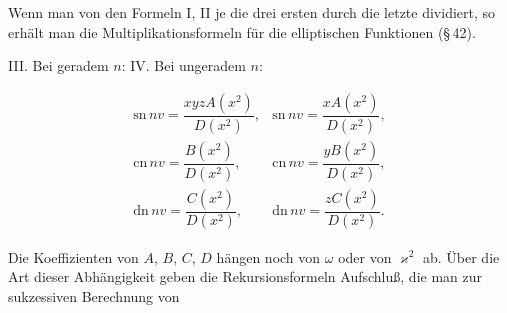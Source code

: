 Wenn man von den Formeln I, II je die drei ersten durch die letzte
dividiert, so erhält man die Multiplikationsformeln für die elliptischen
Funktionen (\S\,42).

\begin{center}
III. Bei geradem $n$: \qquad\qquad IV. Bei ungeradem $n$:
\end{center}
\[
\begin{array}{ll}
\mathrm{sn}\,nv = \dfrac{xyzA(x^2)}{D(x^2)}, & \mathrm{sn}\,nv = \dfrac{xA(x^2)}{D(x^2)}, \\[10pt]
\mathrm{cn}\,nv = \dfrac{B(x^2)}{D(x^2)}, & \mathrm{cn}\,nv = \dfrac{yB(x^2)}{D(x^2)}, \\[10pt]
\mathrm{dn}\,nv = \dfrac{C(x^2)}{D(x^2)}, & \mathrm{dn}\,nv = \dfrac{zC(x^2)}{D(x^2)}.
\end{array}
\]

Die Koeffizienten von $A$, $B$, $C$, $D$ hängen noch von $\omega$ oder von
$\varkappa^2$ ab. Über die Art dieser Abhängigkeit geben die Rekursionsformeln
Aufschluß, die man zur sukzessiven Berechnung von
